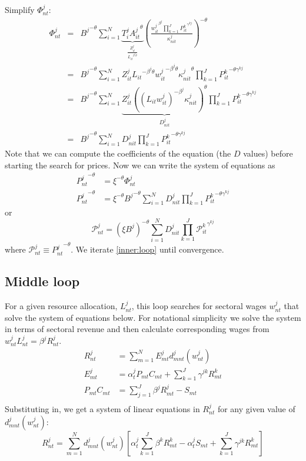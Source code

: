 \documentclass[12pt]{article}
\begin{document}
Simplify $\Phi_{nt}^j:$
\begin{eqnarray*}
  \Phi_{nt}^j &=&  {B^j}^{-\theta} \sum_{i = 1}^N \underbrace{T_i^j {A_{it}^j}^{\theta}}_{\frac{Z_{it}^j}{{L_{it}}^{\beta^j\theta}}} \left(\frac{ {w_{it}^j}^{\beta^j} \prod_{k = 1}^{J}{P_{it}^k}^{\gamma^{kj}}}{\kappa_{nit}^j}\right)^{-\theta}\\
  &=& {B^j}^{-\theta} \sum_{i = 1}^N Z_{it}^j {L_{it}}^{- \beta^j\theta} {w_{it}^j}^{-\beta^j\theta} {\kappa_{nit}^j}^{\theta} \prod_{k = 1}^{J}{P_{it}^k}^{-\theta\gamma^{kj}}\\
  &=& {B^j}^{-\theta} \sum_{i = 1}^N \underbrace{Z_{it}^j {\left((L_{it}w_{it}^j)^{- \beta^j} \kappa_{nit}^j\right)}^{\theta}}_{D_{nit}^j} \prod_{k = 1}^{J}{P_{it}^k}^{-\theta\gamma^{kj}}\\
  &=& {B^j}^{-\theta} \sum_{i = 1}^N D_{nit}^j \prod_{k = 1}^{J}{P_{it}^k}^{-\theta\gamma^{kj}}
\end{eqnarray*}
%
Note that we can compute the coefficients of the equation (the $D$ values) before starting the search for prices.
Now we can write the system of equations as
\begin{align*}
{P_{nt}^j}^{-\theta} &= \xi^{-\theta} {\Phi_{nt}^j}\\ 
%
{P_{nt}^j}^{-\theta} &= \xi^{-\theta} {{B^j}^{-\theta} \sum_{i = 1}^N D_{nit}^j \prod_{k = 1}^{J}{P_{it}^k}^{-\theta\gamma^{kj}}}
\end{align*}
or
\begin{equation}\label{inner:loop}
\mathcal{P}_{nt}^j = \left(\xi B^j\right)^{-\theta} \sum_{i = 1}^N D_{nit}^j \prod_{k = 1}^{J}{\mathcal{P}_{it}^k}^{\gamma^{kj}} 
\end{equation}
where $\mathcal{P}_{nt}^j \equiv {P_{nt}^j}^{-\theta}$. We iterate \eqref{inner:loop} until convergence.

\subsection{Middle loop}
For a given resource allocation, $L_{nt}^j$, this loop searches for sectoral wages $w_{nt}^j$ that solve the system of equations below.
For notational simplicity we solve the system in terms of sectoral revenue and then calculate corresponding wages from $w_{nt}^j L_{nt}^j = \beta^j R_{nt}^j$.
\begin{align*}
R^j_{nt} &= \sum_{m=1}^N E^j_{mt} d^j_{mnt}\!\left(w_{nt}^j\right)  \\
%
E^j_{mt} &= \alpha^j_t P_{mt}C_{mt} + \sum_{k=1}^J \gamma^{jk}R^k_{mt} \\
%
P_{mt}C_{mt} &= \sum_{j=1}^J \beta^j R_{mt}^j - S_{mt} \\
\end{align*}
Substituting in, we get a system of linear equations in $R_{nt}^j$ for any given value of $d_{mnt}^j(w_{nt}^j)$:
\begin{equation}\label{middle:loop}
R^j_{nt} = 
\sum_{m=1}^N
	d_{mnt}^j(w_{nt}^j)
	\left[
		\alpha^j_t \sum_{k=1}^J \beta^k R_{mt}^k 
		- \alpha^j_tS_{mt} 
		+ \sum_{k=1}^J \gamma^{jk}R^k_{mt} 
	\right]
\end{equation}
\end{document}

